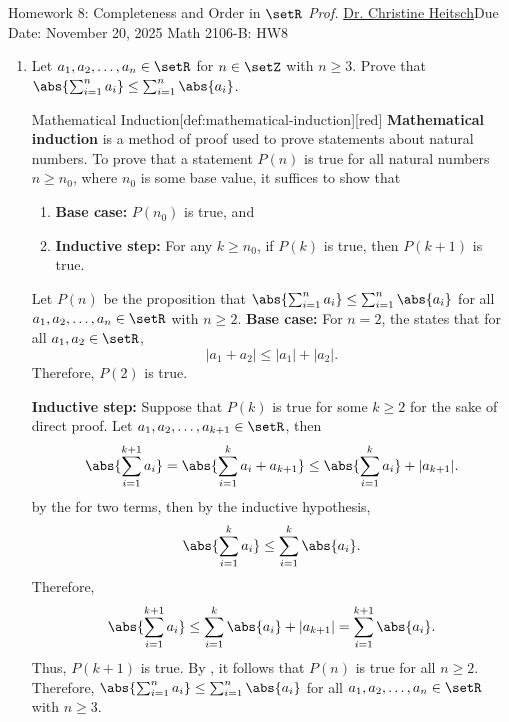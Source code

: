\newpage{}
{Homework 8: Completeness and Order in $\setR$}
{\textit{Prof.} \href{https://ceheitsch.github.io/webpage/}{Dr. Christine Heitsch}}{Due Date: November 20, 2025}
{Math 2106-B: HW8}


\newpage
\begin{enumerate}
  \item Let $a_1, a_2, \ldots, a_n \in \setR$ for $n \in \setZ$ with $n \geq 3$. 
  Prove that $\abs{\sum_{i=1}^n a_i} \leq \sum_{i=1}^n\abs{a_i}$.
  \begin{define}{Mathematical Induction}[def:mathematical-induction][red]
    \textbf{Mathematical induction} is a method of proof used to prove statements about natural numbers.
    To prove that a statement \(P(n)\) is true for all natural numbers \(n \geq n_{0}\), where \(n_{0}\) is some base value, it suffices to show that
    \begin{enumerate}
      \item \textbf{Base case:} \(P(n_{0})\) is true, and
      \item \textbf{Inductive step:} For any \(k \geq n_{0}\), if \(P(k)\) is true, then \(P(k+1)\) is true.
    \end{enumerate}
  \end{define}
  \begin{subprove}
    Let $P(n)$ be the proposition that 
    $\abs{\sum_{i=1}^n a_i} \leq \sum_{i=1}^n\abs{a_i}$ 
    for all $a_1, a_2, \ldots, a_n \in \setR$ with $n \geq 2$.
    \textbf{Base case:} For $n = 2$, the  states that for all $a_1, a_2 \in \setR$,
    \[
      |a_1 + a_2| \leq |a_1| + |a_2|.
    \]
    Therefore, $P(2)$ is true.
    
    \textbf{Inductive step:} Suppose that $P(k)$ is true for some $k \geq 2$ 
    for the sake of direct proof. 
    Let $a_1, a_2, \ldots, a_{k+1} \in \setR$, then
    \[
      \abs{\sum_{i=1}^{k+1} a_i} = \abs{\sum_{i=1}^k a_i + a_{k+1}} \leq \abs{\sum_{i=1}^k a_i} + |a_{k+1}|.
    \]
    by the  for two terms, then by the inductive hypothesis,
    \[
      \abs{\sum_{i=1}^k a_i} \leq \sum_{i=1}^k\abs{a_i}.
    \]
    Therefore,
    \[
      \abs{\sum_{i=1}^{k+1} a_i} \leq \sum_{i=1}^k\abs{a_i} + |a_{k+1}| = \sum_{i=1}^{k+1}\abs{a_i}.
    \]
    Thus, $P(k+1)$ is true.
    By , it follows that $P(n)$ is true for all $n \geq 2$.
    Therefore, $\abs{\sum_{i=1}^n a_i} \leq \sum_{i=1}^n\abs{a_i}$ for all $a_1, a_2, \ldots, a_n \in \setR$ with $n \geq 3$.
  \end{subprove}






\end{enumerate}
